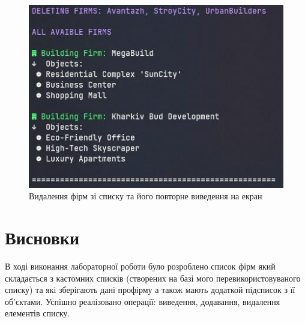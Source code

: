 \begin{figure}[h!]
  \centering
  \includegraphics[width=15cm]{reports/algos/lab8/assets/2.jpeg}
  \caption{Видалення фірм зі списку та його повторне виведення на екран}
\end{figure}

\clearpage
\section{Висновки}
  В ході виконання лабораторної роботи було розроблено список фірм який складається з кастомних списків (створених на базі мого перевикористовуваного списку) та які зберігають дані профірму а також мають додаткой підсписок з її об’єктами. Успішно реалізовано операції: виведення, додавання, видалення елементів списку.



